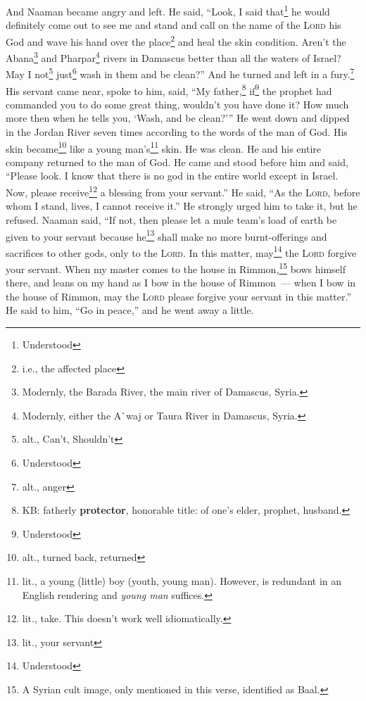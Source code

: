 \begin{inparaenum}
     And Naaman became angry and left. He said, ``Look, I said that\footnote{Understood} he would definitely come out to see me and stand and call on the name of the \textsc{Lord} his God and wave his hand over the place\footnote{i.e., the affected place} and heal the skin condition.%
     Aren't the Abana\footnote{Modernly, the Barada River, the main river of Damascus, Syria.} and Pharpar\footnote{Modernly, either the A\`{}waj or Taura River in Damascus, Syria.} rivers in Damascus better than all the waters of Israel? May I not\footnote{alt., Can't, Shouldn't} just\footnote{Understood} wash in them and be clean?'' And he turned and left in a fury.\footnote{alt., anger}%
     His servant came near, spoke to him, said, ``My father,\footnote{KB: fatherly \textbf{protector}, honorable title: of one's elder, prophet, husband.} if\footnote{Understood} the prophet had commanded you to do some great thing, wouldn't you have done it? How much more then when he tells you, `Wash, and be clean?'\thinspace''%
     He went down and dipped in the Jordan River seven times according to the words of the man of God. His skin became\footnote{alt., turned back, returned} like a young man's\footnote{lit., a young (little) boy (youth, young man). However,  is redundant in an English rendering and \textit{young man} suffices.} skin. He was clean.%
     He and his entire company returned to the man of God. He came and stood before him and said, ``Please look. I know that there is no god in the entire world except in Israel. Now, please receive\footnote{lit., take. This doesn't work well idiomatically.} a blessing from your servant.''%
     He said, ``As the \textsc{Lord}, before whom I stand, lives, I cannot receive it.'' He strongly urged him to take it, but he refused.%
     Naaman said, ``If not, then please let a mule team's load of earth be given to your servant because he\footnote{lit., your servant} shall make no more burnt-offerings and sacrifices to other gods, only to the \textsc{Lord}.%
     In this matter, may\footnote{Understood} the \textsc{Lord} forgive your servant. When my master comes to the house in Rimmon,\footnote{A Syrian cult image, only mentioned in this verse, identified as Baal.} bows himself there, and leans on my hand as I bow in the house of Rimmon~--- when I bow in the house of Rimmon, may the \textsc{Lord} please forgive your servant in this matter.''%
     He said to him, ``Go in peace,'' and he went away a little.%
    

\end{inparaenum}

